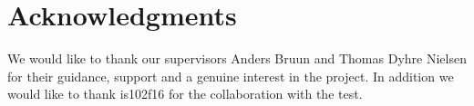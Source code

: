 
\section{Acknowledgments}
We would like to thank our supervisors Anders Bruun and Thomas Dyhre Nielsen for their guidance, support and a genuine interest in the project. In addition we would like to thank is102f16 for the collaboration with the test.